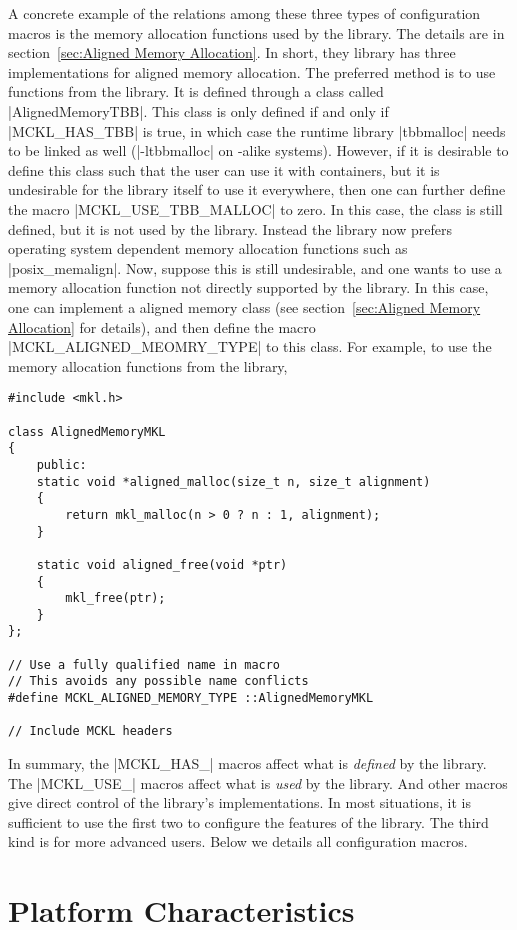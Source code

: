 A concrete example of the relations among these three types of configuration
macros is the memory allocation functions used by the library. The details are
in section~\ref{sec:Aligned Memory Allocation}. In short, they library has
three implementations for aligned memory allocation. The preferred method is to
use functions from the \tbb library. It is defined through a class called
|AlignedMemoryTBB|. This class is only defined if and only if |MCKL_HAS_TBB| is
true, in which case the runtime library |tbbmalloc| needs to be linked as well
(|-ltbbmalloc| on \unix-alike systems). However, if it is desirable to define
this class such that the user can use it with \stl containers, but it is
undesirable for the library itself to use it everywhere, then one can further
define the macro |MCKL_USE_TBB_MALLOC| to zero. In this case, the class is
still defined, but it is not used by the library. Instead the library now
prefers operating system dependent memory allocation functions such as
|posix_memalign|. Now, suppose this is still undesirable, and one wants to use
a memory allocation function not directly supported by the library. In this
case, one can implement a aligned memory class (see section~\ref{sec:Aligned
Memory Allocation} for details), and then define the macro
|MCKL_ALIGNED_MEOMRY_TYPE| to this class. For example, to use the memory
allocation functions from the \mkl library,
\begin{verbatim}
#include <mkl.h>

class AlignedMemoryMKL
{
    public:
    static void *aligned_malloc(size_t n, size_t alignment)
    {
        return mkl_malloc(n > 0 ? n : 1, alignment);
    }

    static void aligned_free(void *ptr)
    {
        mkl_free(ptr);
    }
};

// Use a fully qualified name in macro
// This avoids any possible name conflicts
#define MCKL_ALIGNED_MEMORY_TYPE ::AlignedMemoryMKL

// Include MCKL headers
\end{verbatim}
In summary, the |MCKL_HAS_| macros affect what is \emph{defined} by the
library. The |MCKL_USE_| macros affect what is \emph{used} by the library. And
other macros give direct control of the library's implementations. In most
situations, it is sufficient to use the first two to configure the features of
the library. The third kind is for more advanced users. Below we details all
configuration macros.

\section{Platform Characteristics}
\label{sec:Platform Characteristics}

